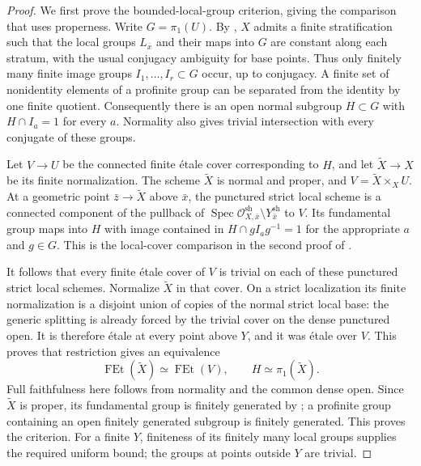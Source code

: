 \begin{proof}
We first prove the bounded-local-group criterion, giving the
comparison that uses properness. Write $G=\pi_1(U)$. By
\cite[Proposition 3.2, arXiv pp.~3--4]{BCGST2019D}, $X$ admits a
finite stratification such that the local groups $L_{\bar x}$
and their maps into $G$ are constant along each stratum, with the
usual conjugacy ambiguity for base points. Thus only finitely many
finite image groups $I_1,\ldots,I_r\subset G$ occur, up to
conjugacy. A finite set of nonidentity elements of a profinite group
can be separated from the identity by one finite quotient.
Consequently there is an open normal subgroup $H\subset G$ with
$H\cap I_a=1$ for every $a$. Normality also gives trivial
intersection with every conjugate of these groups.

Let $V\to U$ be the connected finite \'etale cover corresponding
to $H$, and let $\widetilde X\to X$ be its finite normalization.
The scheme $\widetilde X$ is normal and proper, and
$V=\widetilde X\times_XU$. At a geometric point
$\bar z\to\widetilde X$ above $\bar x$, the punctured strict
local scheme is a connected component of the pullback of
$\operatorname{Spec}\mathcal O^{\mathrm{sh}}_{X,\bar x}
\setminus Y^{\mathrm{sh}}_{\bar x}$ to $V$. Its fundamental
group maps into $H$ with image contained in
$H\cap gI_ag^{-1}=1$ for the appropriate $a$ and $g\in G$.
This is the local-cover comparison in the second proof of
\cite[Corollary 4.2, arXiv pp.~7--8]{BCGST2019D}.

It follows that every finite \'etale cover of $V$ is trivial on
each of these punctured strict local schemes. Normalize
$\widetilde X$ in that cover. On a strict localization its finite
normalization is a disjoint union of copies of the normal strict
local base: the generic splitting is already forced by the
trivial cover on the dense punctured open. It is therefore \'etale
at every point above $Y$, and it was \'etale over $V$. This proves
that restriction gives an equivalence
\[
 \operatorname{FEt}(\widetilde X)\simeq\operatorname{FEt}(V),
 \qquad H\simeq\pi_1(\widetilde X).
\]
Full faithfulness here follows from normality and the common
dense open. Since $\widetilde X$ is proper, its fundamental group
is finitely generated by \cite[X, Theorem 2.9]{SGA1}; a profinite
group containing an open finitely generated subgroup is finitely
generated. This proves the criterion. For a finite $Y$, finiteness
of its finitely many local groups supplies the required uniform
bound; the groups at points outside $Y$ are trivial.


\end{proof}
